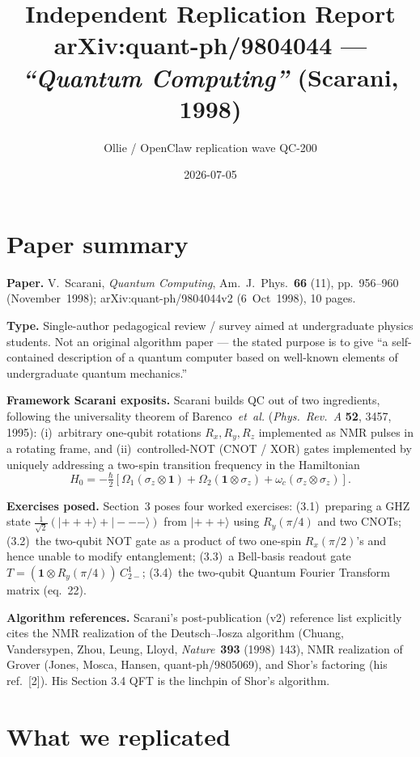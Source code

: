 \documentclass[11pt]{article}
\title{Independent Replication Report\\
\large arXiv:quant-ph/9804044 --- \emph{``Quantum Computing''} (Scarani, 1998)}
\author{Ollie / OpenClaw replication wave QC-200}
\date{2026-07-05}
\begin{document}
\maketitle

\section{Paper summary}

\textbf{Paper.} V.~Scarani, \emph{Quantum Computing}, Am.~J.~Phys.~\textbf{66} (11), pp.~956--960 (November~1998); arXiv:quant-ph/9804044v2 (6~Oct~1998), 10 pages.

\textbf{Type.} Single-author pedagogical review / survey aimed at undergraduate physics students.  Not an original algorithm paper --- the stated purpose is to give ``a self-contained description of a quantum computer based on well-known elements of undergraduate quantum mechanics.''

\textbf{Framework Scarani exposits.}  Scarani builds QC out of two ingredients, following the universality theorem of Barenco~\emph{et~al.} (\emph{Phys.~Rev.~A} \textbf{52}, 3457, 1995): (i)~arbitrary one-qubit rotations $R_x, R_y, R_z$ implemented as NMR pulses in a rotating frame, and (ii)~controlled-NOT (CNOT / XOR) gates implemented by uniquely addressing a two-spin transition frequency in the Hamiltonian
\[
H_0 = -\tfrac{\hbar}{2}\!\left[ \Omega_1 (\sigma_z\!\otimes\!\mathbf{1}) + \Omega_2 (\mathbf{1}\!\otimes\!\sigma_z) + \omega_c (\sigma_z\!\otimes\!\sigma_z) \right].
\]

\textbf{Exercises posed.}  Section~3 poses four worked exercises: (3.1)~preparing a GHZ state $\tfrac{1}{\sqrt 2}(|{+}{+}{+}\rangle+|{-}{-}{-}\rangle)$ from $|{+}{+}{+}\rangle$ using $R_y(\pi/4)$ and two CNOTs; (3.2)~the two-qubit NOT gate as a product of two one-spin $R_x(\pi/2)$'s and hence unable to modify entanglement; (3.3)~a Bell-basis readout gate $T = (\mathbf{1}\otimes R_y(\pi/4))\,C^1_{2-}$; (3.4)~the two-qubit Quantum Fourier Transform matrix (eq.~22).

\textbf{Algorithm references.}  Scarani's post-publication (v2) reference list explicitly cites the NMR realization of the Deutsch--Josza algorithm (Chuang, Vandersypen, Zhou, Leung, Lloyd, \emph{Nature}~\textbf{393} (1998) 143), NMR realization of Grover (Jones, Mosca, Hansen, quant-ph/9805069), and Shor's factoring (his ref.~[2]).  His Section 3.4 QFT is the linchpin of Shor's algorithm.

\section{What we replicated}
\end{document}
